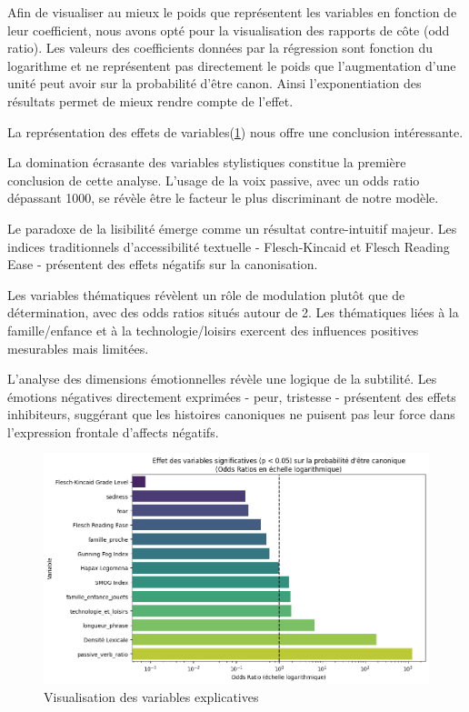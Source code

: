 \documentclass[12pt,a4paper,oneside,titlepage]{book} %
\begin{document}
Afin de visualiser au mieux le poids que représentent les variables en fonction de leur coefficient, nous avons opté pour la visualisation des rapports de côte (odd ratio). Les valeurs des coefficients données par la régression sont fonction du logarithme et ne représentent pas directement le poids que l'augmentation d'une unité peut avoir sur la probabilité d'être canon. 
Ainsi l'exponentiation des résultats permet de mieux rendre compte de l'effet.

La représentation des effets de variables(\ref{fig:logit_odd_ratios}) nous offre une conclusion intéressante.

La domination écrasante des variables stylistiques constitue la première conclusion de cette analyse. L'usage de la voix passive, avec un odds ratio dépassant 1000, se révèle être le facteur le plus discriminant de notre modèle.

Le paradoxe de la lisibilité émerge comme un résultat contre-intuitif majeur. Les indices traditionnels d'accessibilité textuelle - Flesch-Kincaid et Flesch Reading Ease - présentent des effets négatifs sur la canonisation. 

Les variables thématiques révèlent un rôle de modulation plutôt que de détermination, avec des odds ratios situés autour de 2. Les thématiques liées à la famille/enfance et à la technologie/loisirs exercent des influences positives mesurables mais limitées. 

L'analyse des dimensions émotionnelles révèle une logique de la subtilité. Les émotions négatives directement exprimées - peur, tristesse - présentent des effets inhibiteurs, suggérant que les histoires canoniques ne puisent pas leur force dans l'expression frontale d'affects négatifs.



\begin{figure}
    \centering
    \includegraphics[width=\linewidth]{illustration/odd_ratios_logit.png}
    \caption{Visualisation des variables explicatives}
    \label{fig:logit_odd_ratios}
\end{figure}
\end{document}
